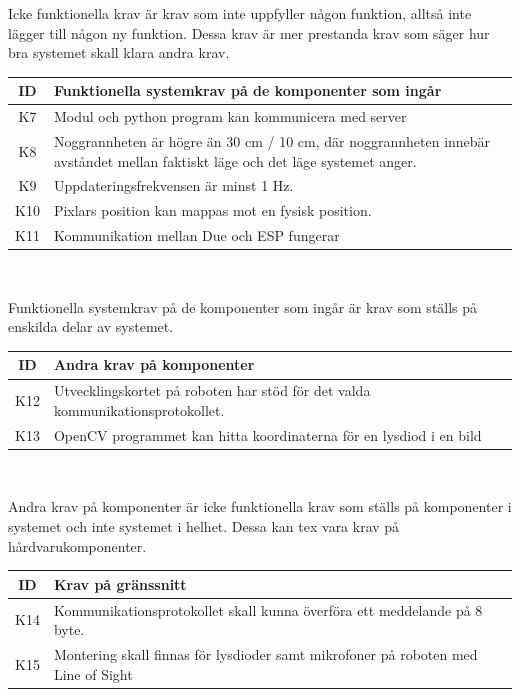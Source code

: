 \documentclass[11pt, a4paper]{report}
\begin{document}
Icke funktionella krav är krav som inte uppfyller någon funktion, alltså inte lägger till någon ny funktion. Dessa krav är mer prestanda krav som säger hur bra systemet skall klara andra krav.

\begin{center}
	\begin{tabular}{c | p{13.5cm}}
	ID & Funktionella systemkrav på de komponenter som ingår \\ \hline
	K7 & Modul och python program kan kommunicera med server \\
	K8 & Noggrannheten är högre än 30 cm / 10 cm, där noggrannheten innebär avståndet mellan faktiskt läge och det läge systemet anger. \\
	K9 & Uppdateringsfrekvensen är minst 1 Hz. \\
	K10 & Pixlars position kan mappas mot en fysisk position. \\
	K11 & Kommunikation mellan Due och ESP fungerar \\	
	\end{tabular}
	\\ [0.5cm]
\end{center}

Funktionella systemkrav på de komponenter som ingår är krav som ställs på enskilda delar av systemet.

\begin{center}
	\begin{tabular}{c | p{13.5cm}}
	ID & Andra krav på komponenter \\ \hline
	K12 & Utvecklingskortet på roboten har stöd för det valda kommunikationsprotokollet. \\
	K13 & OpenCV programmet kan hitta koordinaterna för en lysdiod i en bild \\	
	\end{tabular}
	\\ [0.5cm]
\end{center}

Andra krav på komponenter är icke funktionella krav som ställs på komponenter i systemet och inte systemet i helhet. Dessa kan tex vara krav på hårdvarukomponenter.

\begin{center}
	\begin{tabular}{c | p{13.5cm}}
	ID & Krav på gränssnitt \\ \hline
	K14 & Kommunikationsprotokollet skall kunna överföra ett meddelande på 8 byte. \\
	K15 & Montering skall finnas för lysdioder samt mikrofoner på roboten med Line of Sight \\	
	\end{tabular}
\end{center}
\end{document}
